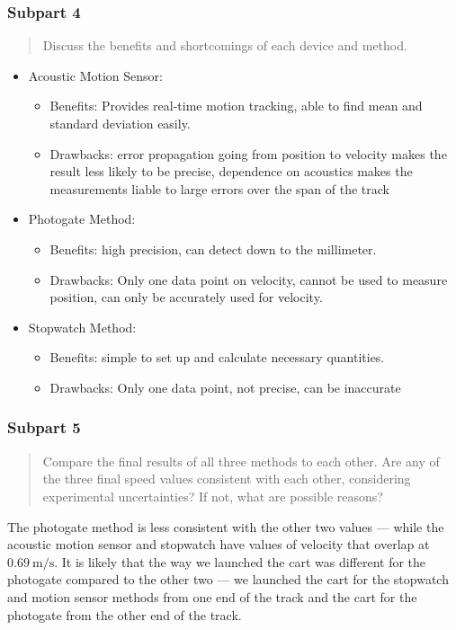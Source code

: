 \documentclass[8pt]{extarticle}
\newcommand{\plain}[1]{\textrm{#1}}
\begin{document}
{\subsubsection*{Subpart 4}
\begin{quote}
	Discuss the benefits and shortcomings of each device and method.
\end{quote}
\begin{itemize}
	\item Acoustic Motion Sensor:
	\begin{itemize}
		\item Benefits: Provides real-time motion tracking, able to find mean and standard deviation easily.
		\item Drawbacks: error propagation going from position to velocity makes the result less likely to be precise, dependence on acoustics makes the measurements liable to large errors over the span of the track
	\end{itemize}
	\item Photogate Method:
	\begin{itemize}
		\item Benefits: high precision, can detect down to the millimeter.
		\item Drawbacks: Only one data point on velocity, cannot be used to measure position, can only be accurately used for velocity.
	\end{itemize}
	\item Stopwatch Method:
	\begin{itemize}
		\item Benefits: simple to set up and calculate necessary quantities.
		\item Drawbacks: Only one data point, not precise, can be inaccurate
	\end{itemize}
\end{itemize}
\subsubsection*{Subpart 5}
\begin{quote}
	Compare the final results of all three methods to each other. Are any of the three final speed values consistent with each other, considering experimental uncertainties? If not, what are possible reasons?
\end{quote}
The photogate method is less consistent with the other two values — while the acoustic motion sensor and stopwatch have values of velocity that overlap at $0.69~\plain{m/s}$. It is likely that the way we launched the cart was different for the photogate compared to the other two — we launched the cart for the stopwatch and motion sensor methods from one end of the track and the cart for the photogate from the other end of the track.
}
\end{document}

